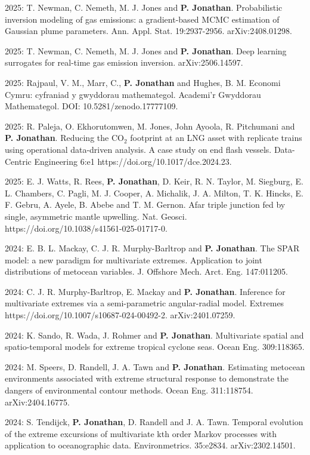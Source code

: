 \documentclass[11pt,a4paper]{moderncv}
\begin{document}
2025: T. Newman, C. Nemeth, M. J. Jones and \textbf{P. Jonathan}. Probabilistic inversion modeling of gas emissions: a gradient-based MCMC estimation of Gaussian plume parameters. Ann. Appl. Stat. 19:2937-2956. arXiv:2408.01298.

2025: T. Newman, C. Nemeth, M. J. Jones and \textbf{P. Jonathan}. Deep learning surrogates for real-time gas emission inversion. arXiv:2506.14597.

2025: Rajpaul, V. M., Marr, C., \textbf{P. Jonathan} and Hughes, B. M. Economi Cymru: cyfraniad y gwyddorau mathemategol. Academi’r Gwyddorau Mathemategol. DOI: 10.5281/zenodo.17777109.

2025: R. Paleja, O. Ekhorutomwen, M. Jones, John Ayoola, R. Pitchumani and \textbf{P. Jonathan}. Reducing the CO$_2$ footprint at an LNG asset with replicate trains using operational data-driven analysis. A case study on end flash vessels. Data-Centric Engineering 6:e1 https://doi.org/10.1017/dce.2024.23.

2025: E. J. Watts, R. Rees, \textbf{P. Jonathan}, D. Keir, R. N. Taylor, M. Siegburg, E. L. Chambers, C. Pagli, M. J. Cooper, A. Michalik, J. A. Milton, T. K. Hincks, E. F. Gebru, A. Ayele, B. Abebe and T. M. Gernon.  Afar triple junction fed by single, asymmetric mantle upwelling. Nat. Geosci. https://doi.org/10.1038/s41561-025-01717-0.

2024: E. B. L. Mackay, C. J. R. Murphy-Barltrop and \textbf{P. Jonathan}. The SPAR model: a new paradigm for multivariate extremes. Application to joint distributions of metocean variables. J. Offshore Mech. Arct. Eng. 147:011205.

2024: C. J. R. Murphy-Barltrop, E. Mackay and \textbf{P. Jonathan}. Inference for multivariate extremes via a semi-parametric angular-radial model. Extremes https://doi.org/10.1007/s10687-024-00492-2.  arXiv:2401.07259.

2024: K. Sando, R. Wada, J. Rohmer and \textbf{P. Jonathan}. Multivariate spatial and spatio-temporal models for extreme tropical cyclone seas. Ocean Eng. 309:118365. 

2024: M. Speers, D. Randell, J. A. Tawn and \textbf{P. Jonathan}. Estimating metocean environments associated with extreme structural response to demonstrate the dangers of environmental contour methods. Ocean Eng. 311:118754. arXiv:2404.16775.

2024: S. Tendijck, \textbf{P. Jonathan}, D. Randell and J. A. Tawn. Temporal evolution of the extreme excursions of multivariate kth order Markov processes with application to oceanographic data. Environmetrics. 35:e2834. arXiv:2302.14501.
\end{document}
